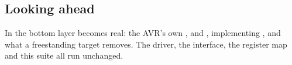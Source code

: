 \subsection*{Looking ahead}
In  the bottom layer becomes real: the AVR's own ,  and
,  implementing , and what a freestanding
target removes. The driver, the interface, the register map and this suite all run unchanged.
